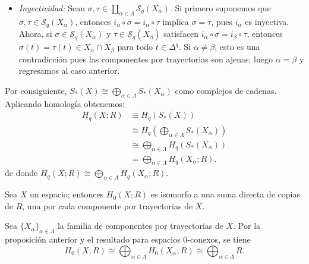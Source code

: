 \begin{dem}
\begin{itemize}
    \item \textit{Inyectividad:} Sean $\sigma, \tau \in \coprod_{\alpha \in \Lambda} \mathcal{S}_q(X_\alpha)$. Si primero suponemos que $\sigma, \tau \in \mathcal{S}_q(X_\alpha)$, entonces $i_\alpha \circ \sigma = i_\alpha \circ \tau$ implica $\sigma = \tau$, pues $i_\alpha$ es inyectiva. Ahora, si $\sigma \in \mathcal{S}_q(X_\alpha)$ y $\tau \in \mathcal{S}_q(X_\beta)$ satisfacen $i_\alpha \circ \sigma = i_\beta \circ \tau$, entonces $\sigma(t) = \tau(t) \in X_\alpha \cap X_\beta$ para todo $t \in \Delta^q$. Si $\alpha \neq \beta$, esto es una contradicción pues las componentes por trayectorias son ajenas; luego $\alpha = \beta$ y regresamos al caso anterior.
\end{itemize}

Por consiguiente, $S_*(X) \cong \bigoplus_{\alpha \in \Lambda} S_*(X_\alpha)$ como complejos de cadenas. Aplicando homología obtenemos:
\begin{align*}
H_q(X; R) &\equiv H_q(S_*(X)) \\
&\cong H_q\!\left(\bigoplus_{\alpha \in \Lambda} S_*(X_\alpha)\right) \\
&\cong \bigoplus_{\alpha \in \Lambda} H_q(S_*(X_\alpha))  \\
&= \bigoplus_{\alpha \in \Lambda} H_q(X_\alpha; R).
\end{align*}
de donde $H_q(X; R) \cong \bigoplus_{\alpha \in \Lambda} H_q(X_\alpha; R)$.
\end{dem}

\begin{coro}
Sea $X$ un espacio; entonces $H_0(X; R)$ es isomorfo a una suma directa de copias de $R$, una por cada componente por trayectorias de $X$.
\end{coro}

\begin{dem}
Sea $\{X_\alpha\}_{\alpha \in \Lambda}$ la familia de componentes por trayectorias de $X$. Por la proposición anterior y el resultado para espacios $0$-conexos, se tiene
\[
H_0(X; R) \cong \bigoplus_{\alpha \in \Lambda} H_0(X_\alpha; R) \cong \bigoplus_{\alpha \in \Lambda} R.
\]
\end{dem}

